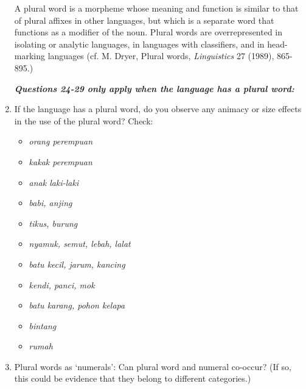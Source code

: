 \documentclass[output=paper]{LSP/langsci}
\begin{document}
\begin{enumerate}
A plural word is a morpheme whose meaning and function is similar to that of plural affixes in other languages, but which is a separate word that functions as a modifier of the noun.  Plural words are overrepresented in isolating or analytic languages, in languages with classifiers, and in head-marking languages (cf. M. Dryer, Plural words, \textit{Linguistics} 27 (1989), 865-895.) \nocite{Dryer1989}

\textbf{\textit{Questions 24-29 only apply when the language has a plural word:}}

\item  If the language has a plural word, do you observe any animacy or size effects in the use of the plural word? Check:

\begin{itemize}
\item \textit{orang perempuan} 
\item \textit{kakak perempuan} 
\item \textit{anak laki-laki} 
\item \textit{babi, anjing} 
\item \textit{tikus, burung} 
\item \textit{nyamuk, semut, lebah, lalat} 
\item \textit{batu kecil, jarum, kancing}
\item \textit{kendi, panci, mok}
\item \textit{batu karang, pohon kelapa}
\item \textit{bintang}
\item \textit{rumah}
\end{itemize}
\item  Plural words as `numerals': Can plural word and numeral co-occur? (If so, this could be evidence that they belong to different categories.)


\end{enumerate}
\end{document}
